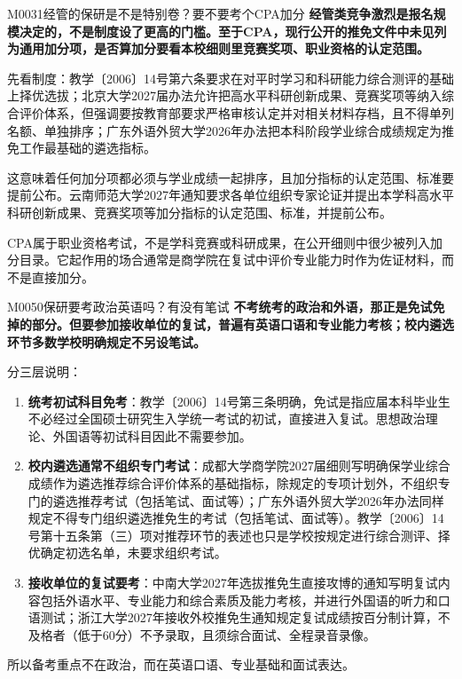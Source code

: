 \begin{qa}{M0031}{经管的保研是不是特别卷？要不要考个CPA加分}
\textbf{经管类竞争激烈是报名规模决定的，不是制度设了更高的门槛。至于CPA，现行公开的推免文件中未见列为通用加分项，是否算加分要看本校细则里竞赛奖项、职业资格的认定范围。}

先看制度：教学〔2006〕14号第六条要求在对平时学习和科研能力综合测评的基础上择优选拔；北京大学2027届办法允许把高水平科研创新成果、竞赛奖项等纳入综合评价体系，但强调要按教育部要求严格审核认定并对相关材料存档，且不得单列名额、单独排序；广东外语外贸大学2026年办法把本科阶段学业综合成绩规定为推免工作最基础的遴选指标。

这意味着任何加分项都必须与学业成绩一起排序，且加分指标的认定范围、标准要提前公布。云南师范大学2027年通知要求各单位组织专家论证并提出本学科高水平科研创新成果、竞赛奖项等加分指标的认定范围、标准，并提前公布。

CPA属于职业资格考试，不是学科竞赛或科研成果，在公开细则中很少被列入加分目录。它起作用的场合通常是商学院在复试中评价专业能力时作为佐证材料，而不是直接加分。
\end{qa}

\begin{qa}{M0050}{保研要考政治英语吗？有没有笔试}
\textbf{不考统考的政治和外语，那正是免试免掉的部分。但要参加接收单位的复试，普遍有英语口语和专业能力考核；校内遴选环节多数学校明确规定不另设笔试。}

分三层说明：

\begin{enumerate}
  \item \textbf{统考初试科目免考}：教学〔2006〕14号第三条明确，免试是指应届本科毕业生不必经过全国硕士研究生入学统一考试的初试，直接进入复试。思想政治理论、外国语等初试科目因此不需要参加。
  \item \textbf{校内遴选通常不组织专门考试}：成都大学商学院2027届细则写明确保学业综合成绩作为遴选推荐综合评价体系的基础指标，除规定的专项计划外，不组织专门的遴选推荐考试（包括笔试、面试等）；广东外语外贸大学2026年办法同样规定不得专门组织遴选推免生的考试（包括笔试、面试等）。教学〔2006〕14号第十五条第（三）项对推荐环节的表述也只是学校按规定进行综合测评、择优确定初选名单，未要求组织考试。
  \item \textbf{接收单位的复试要考}：中南大学2027年选拔推免生直接攻博的通知写明复试内容包括外语水平、专业能力和综合素质及能力考核，并进行外国语的听力和口语测试；浙江大学2027年接收外校推免生通知规定复试成绩按百分制计算，不及格者（低于60分）不予录取，且须综合面试、全程录音录像。
\end{enumerate}

所以备考重点不在政治，而在英语口语、专业基础和面试表达。
\end{qa}

